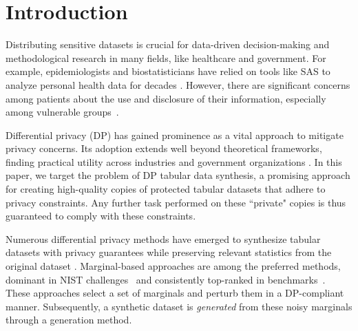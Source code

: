 
\begin{abstract}

We present a novel approach for differentially private data synthesis of protected tabular datasets, a relevant task in highly sensitive domains such as healthcare and government. Current state-of-the-art methods predominantly use marginal-based approaches, where a dataset is generated from private estimates of the marginals. In this paper, we introduce PrivPGD, a new generation method for marginal-based private data synthesis, leveraging tools from optimal transport and particle gradient descent. Our algorithm outperforms existing methods on a large range of datasets
while being highly scalable and offering the flexibility to incorporate additional domain-specific constraints.
\end{abstract}



\section{Introduction}

Distributing sensitive datasets is crucial for data-driven decision-making and methodological research in many fields, like healthcare and government. For example, epidemiologists and biostatisticians have relied on tools like SAS to analyze personal health data for decades \citep{dimaggio2013sas, dankar2012application}. However, there are significant concerns among patients about the use and disclosure of their information, especially among vulnerable groups~\citep{el2011case}.



Differential privacy (DP) has gained prominence as a vital approach to mitigate privacy concerns.   Its adoption extends well beyond theoretical frameworks, finding practical utility across industries and government organizations \citep{johnson2018towards,abowd2018us,aktay2020google}. 
In this paper, we target the problem of DP tabular data synthesis, a promising approach for creating high-quality copies of protected tabular datasets that adhere to privacy constraints. Any further task performed on these ``private" copies is thus guaranteed to comply with these constraints.


Numerous differential privacy methods have emerged to synthesize tabular datasets with privacy guarantees while preserving relevant statistics from the original dataset \citep{hu2023sok, tao2021benchmarking}. %
Marginal-based approaches are among the preferred methods, dominant in NIST challenges~\citep{mst} and consistently top-ranked in benchmarks~\citep{tao2021benchmarking}. These approaches select a set of marginals and perturb them in a DP-compliant manner. Subsequently, a synthetic dataset is \textit{generated} from these noisy marginals through a generation method.


